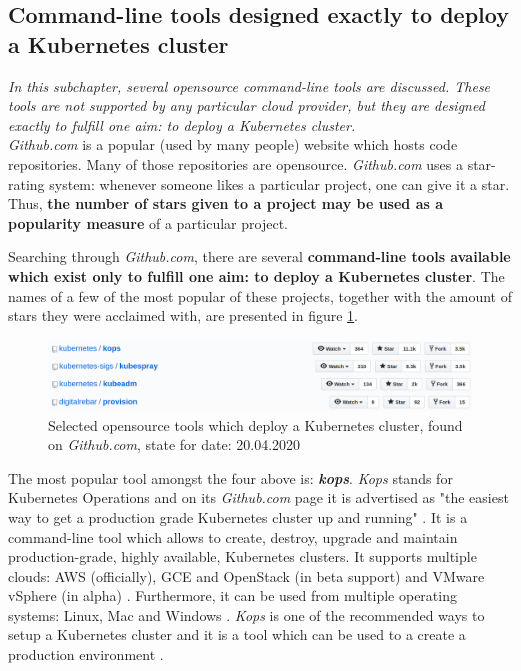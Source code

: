\subsection{Command-line tools designed exactly to deploy a Kubernetes cluster}
\label{cli-tools-to-k8s}
\textit{In this subchapter, several opensource command-line tools are discussed. These tools are not supported by any particular cloud provider, but they are designed exactly to fulfill one aim: to deploy a Kubernetes cluster.}
\\

\textit{Github.com} is a popular (used by many people) website which hosts code repositories. Many of those repositories are opensource.  \textit{Github.com} uses a star-rating system: whenever someone likes a particular project, one can give it a star. Thus, \textbf{the number of stars given to a project may be used as a popularity measure} of a particular project.

Searching through \textit{Github.com}, there are several \textbf{command-line tools available which exist only to fulfill one aim: to deploy a Kubernetes cluster}. The names of a few of the most popular of these projects, together with the amount of stars they were acclaimed with, are presented in figure \ref{fig:ct}.

\begin{figure}[H]
    \centering
    \includegraphics[width=17cm]{figures/custom-tools.png}
    \captionsetup{justification=centering,margin=2cm}
    \caption{Selected opensource tools which deploy a Kubernetes cluster, found on \textit{Github.com}, state for date: 20.04.2020}
    \label{fig:ct}
\end{figure}

The most popular tool amongst the four above is: \textbf{\textit{kops}}. \textit{Kops} stands for Kubernetes Operations and on its \textit{Github.com} page it is advertised as "the easiest way to get a production grade Kubernetes cluster up and running" \cite{online-kops-gh}. It is a command-line tool which allows to create, destroy, upgrade and maintain production-grade, highly available, Kubernetes clusters. It supports multiple clouds: AWS (officially), GCE and OpenStack (in beta support) and VMware vSphere (in alpha) \cite{online-kops-gh}. Furthermore, it can be used from multiple operating systems: Linux, Mac and Windows \cite{online-kops-install}. \textit{Kops} is one of the recommended ways to setup a Kubernetes cluster and it is a tool which can be used to a create a production environment \cite{book-devops-with-k8s}.

